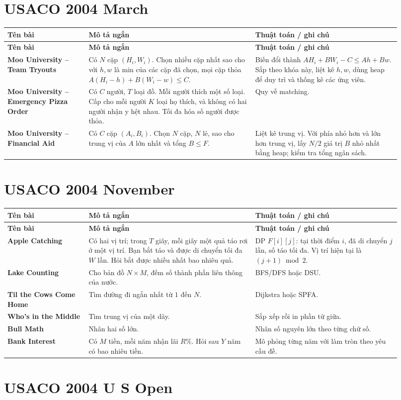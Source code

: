 \documentclass[11pt]{article}
\newenvironment{solutiontable}{%
  \small
  \setlength{\tabcolsep}{4pt}
  \renewcommand{\arraystretch}{1.14}
  \begin{longtable}{L{0.19\linewidth}L{0.39\linewidth}L{0.34\linewidth}}
  \toprule
  \textbf{Tên bài} & \textbf{Mô tả ngắn} & \textbf{Thuật toán / ghi chú}\\
  \midrule
  \endfirsthead
  \toprule
  \textbf{Tên bài} & \textbf{Mô tả ngắn} & \textbf{Thuật toán / ghi chú}\\
  \midrule
  \endhead
}{%
  \bottomrule
  \end{longtable}
  \normalsize
}
\newcommand{\problemrow}[3]{\textbf{#1} & #2 & #3\\\midrule}
\begin{document}
\section{USACO 2004 March}

\begin{solutiontable}
\problemrow{Moo University -- Team Tryouts}{Có \(N\) cặp \((H_i,W_i)\). Chọn nhiều cặp nhất sao cho với \(h,w\) là min của các cặp đã chọn, mọi cặp thỏa \(A(H_i-h)+B(W_i-w)\le C\).}{Biến đổi thành \(AH_i+BW_i-C\le Ah+Bw\). Sắp theo khóa này, liệt kê \(h,w\), dùng heap để duy trì và thống kê các ứng viên.}
\problemrow{Moo University -- Emergency Pizza Order}{Có \(C\) người, \(T\) loại đồ. Mỗi người thích một số loại. Cấp cho mỗi người \(K\) loại họ thích, và không có hai người nhận y hệt nhau. Tối đa hóa số người được thỏa.}{Quy về matching.}
\problemrow{Moo University -- Financial Aid}{Có \(C\) cặp \((A_i,B_i)\). Chọn \(N\) cặp, \(N\) lẻ, sao cho trung vị của \(A\) lớn nhất và tổng \(B\le F\).}{Liệt kê trung vị. Với phía nhỏ hơn và lớn hơn trung vị, lấy \(N/2\) giá trị \(B\) nhỏ nhất bằng heap; kiểm tra tổng ngân sách.}
\end{solutiontable}

\section{USACO 2004 November}

\begin{solutiontable}
\problemrow{Apple Catching}{Có hai vị trí; trong \(T\) giây, mỗi giây một quả táo rơi ở một vị trí. Bạn bắt táo và được di chuyển tối đa \(W\) lần. Hỏi bắt được nhiều nhất bao nhiêu quả.}{DP \(F[i][j]\): tại thời điểm \(i\), đã di chuyển \(j\) lần, số táo tối đa. Vị trí hiện tại là \((j+1)\bmod 2\).}
\problemrow{Lake Counting}{Cho bản đồ \(N\times M\), đếm số thành phần liên thông của nước.}{BFS/DFS hoặc DSU.}
\problemrow{Til the Cows Come Home}{Tìm đường đi ngắn nhất từ \(1\) đến \(N\).}{Dijkstra hoặc SPFA.}
\problemrow{Who's in the Middle}{Tìm trung vị của một dãy.}{Sắp xếp rồi in phần tử giữa.}
\problemrow{Bull Math}{Nhân hai số lớn.}{Nhân số nguyên lớn theo từng chữ số.}
\problemrow{Bank Interest}{Có \(M\) tiền, mỗi năm nhận lãi \(R\%\). Hỏi sau \(Y\) năm có bao nhiêu tiền.}{Mô phỏng từng năm với làm tròn theo yêu cầu đề.}
\end{solutiontable}

\section{USACO 2004 U S Open}
\end{document}
